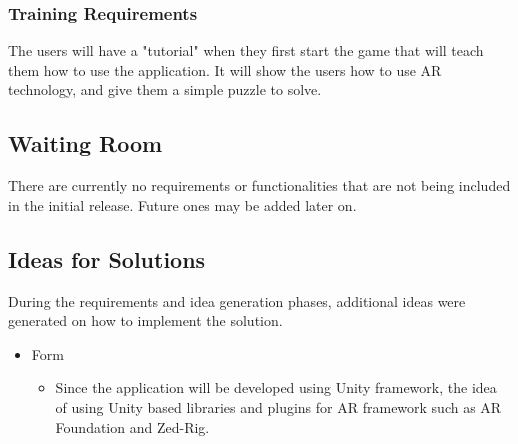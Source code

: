 \documentclass[12pt]{article}
\begin{document}
\subsubsection{Training Requirements}
The users will have a "tutorial" when they first start the game that will teach them how to use the application. It will show the users how to use AR technology, and give them a simple puzzle to solve.

\subsection{Waiting Room}
There are currently no requirements or functionalities that are not being included in the initial release. Future ones may be added later on.

\subsection{Ideas for Solutions}
During the requirements and idea generation phases, additional ideas were generated on how to implement the solution.
\begin{itemize}
    \item Form
    \begin{itemize}
        \item Since the application will be developed using Unity framework, the idea of using Unity based libraries and plugins for AR framework such as AR Foundation and Zed-Rig.
    \end{itemize}
\end{itemize}

\end{document}
